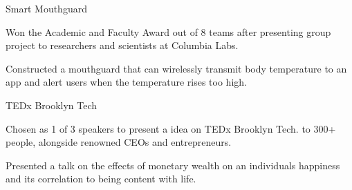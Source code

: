 \begin{cventries}
    
    \cventry
    {} %
    {Smart Mouthguard} %
    {} %
    {} %
    {
      \begin{cvitems} %
        \item {Won the Academic and Faculty Award out of 8 teams after presenting group project to researchers and scientists at Columbia Labs.}
		\item {Constructed a mouthguard that can wirelessly transmit body temperature to an app and alert users when the temperature rises too high.}
      \end{cvitems}
    }
    
    \cventry
    {} %
    {TEDx Brooklyn Tech} %
    {} %
    {} %
    {
      \begin{cvitems} %
        \item {Chosen as 1 of 3 speakers to present a idea on TEDx Brooklyn Tech. to 300+ people, alongside renowned CEOs and entrepreneurs.}
		\item {Presented a talk on the effects of monetary wealth on an individuals happiness and its correlation to being content with life.}
      \end{cvitems}
    }
\end{cventries}